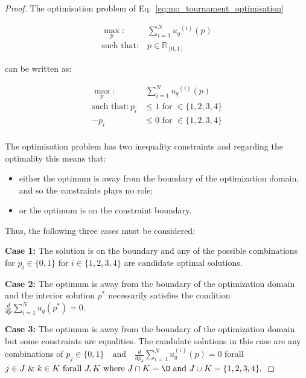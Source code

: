 \documentclass[10pt]{article}
\newcommand{\R}{\mathbb{R}}
\begin{document}
\begin{proof}
    The optimisation problem of Eq.~\ref{eq:mo_tournament_optimisation}

    \begin{equation}\label{eq:mo_tournament_optimisation}
        \begin{aligned}
        \max_p: & \ \sum_{i=1} ^ {N} {u_q}^{(i)} (p)
        \\
        \text{such that}: & \ p \in \R_{[0, 1]}
        \end{aligned}
    \end{equation}

    can be written as:

    \begin{equation}\label{eq:mo_tournament_optimisation_standard}
        \begin{aligned}
        \max_p: & \ \sum_{i=1} ^ {N} {u_q}^{(i)} (p)
        \\
        \text{such that}: p_i & \leq 1 \text{ for } \in \{1, 2, 3, 4\} \\
        - p_i & \leq 0 \text{ for } \in \{1, 2, 3, 4\} \\
        \end{aligned}
    \end{equation}

    The optimisation problem has two inequality constraints and regarding the
    optimality this means that:

    \begin{itemize}
        \item either the optimum is away from the boundary of the optimization
        domain, and so the constraints plays no role;
        \item or the optimum is on the constraint boundary.
    \end{itemize}

    Thus, the following three cases must be considered:

    \textbf{Case 1:} The solution is on the boundary and any of the possible
    combinations for $p_i \in \{0, 1\}$ for $i \in \{1, 2, 3, 4\}$ are candidate
    optimal solutions.

    \textbf{Case 2:} The optimum is away from the boundary of the optimization
    domain and the interior solution $p^*$ necessarily satisfies the condition
    \(\frac{d}{dp} \sum\limits_{i=1} ^ N  u_q(p^*) = 0\).

    \textbf{Case 3:} The optimum is away from the boundary of the optimization
    domain but some constraints are equalities. The candidate solutions in this
    case are any combinations of $p_j \in \{0, 1\} \quad \text{and} \quad
    \frac{d}{dp_k} \sum\limits_{i=1} ^ N  u_q^{(i)}(p) = 0$ forall $ j \in J
    \text{ \& } k \in K \text{ forall } J, K \text{ where } J \cap K = \O
    \text{ and } J \cup K = \{1, 2, 3, 4\}.$


\end{proof}
\end{document}
